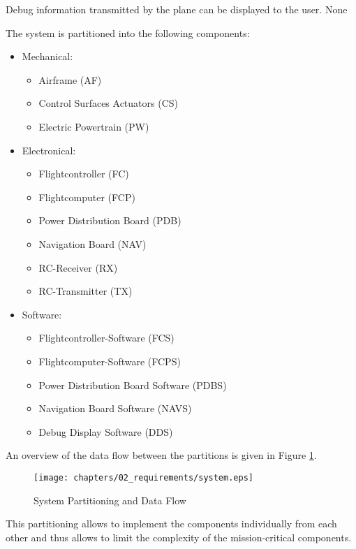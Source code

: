 {Debug information transmitted by the plane can be displayed to the user.}
{ }
{None}

{
			The system is partitioned into the following components: 
			\begin{itemize} 
				\item Mechanical: 
				\begin{itemize} 
					\item Airframe (AF) 
					\item Control Surfaces Actuators (CS) 
					\item Electric Powertrain (PW) 
				\end{itemize} 
				\item Electronical: 
				\begin{itemize} 
					\item Flightcontroller (FC) 
					\item Flightcomputer (FCP) 
					\item Power Distribution Board (PDB) 
					\item Navigation Board (NAV) 
					\item RC-Receiver (RX) 
					\item RC-Transmitter (TX) 
				\end{itemize} \item Software: 
				\begin{itemize} 
					\item Flightcontroller-Software (FCS) 
					\item Flightcomputer-Software (FCPS) 
					\item Power Distribution Board Software (PDBS) 
					\item Navigation Board Software (NAVS) 
					\item Debug Display Software (DDS)
				\end{itemize} 
			\end{itemize} 
			An overview of the data flow between the partitions is given in Figure \ref{fig:sys-hl:partition}. 
			\begin{figure}[H] 
				\centering 
				\texttt{[image: chapters/02\_requirements/system.eps]} 
				\caption{System Partitioning and Data Flow} 
				\label{fig:sys-hl:partition} 
			\end{figure}
		}
{
			This partitioning allows to implement the components individually from each other and thus allows to 
			limit the complexity of the mission-critical components.
		}

